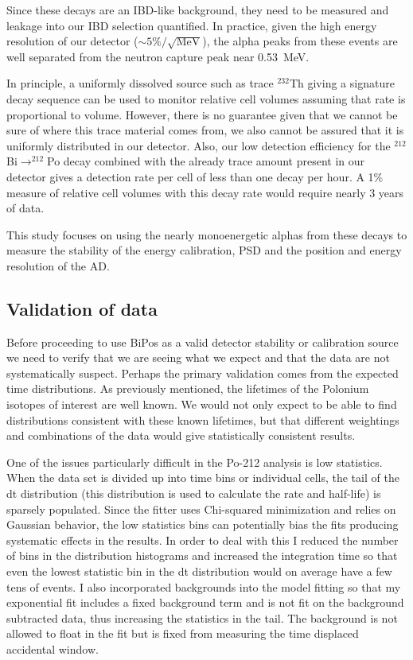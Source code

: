 \begin{itemize}
\end{itemize}

Since these decays are an IBD-like background, they need to be measured and leakage into our IBD selection quantified. In practice, given the high energy resolution of our detector ($\sim5\%/\sqrt{\textrm{MeV}}$), the alpha peaks from these events are well separated from the neutron capture peak near 0.53~MeV.

In principle, a uniformly dissolved source such as trace $^{232}$Th giving a signature decay sequence can be used to monitor relative cell volumes assuming that rate is proportional to volume. However, there is no guarantee given that we cannot be sure of where this trace material comes from, we also cannot be assured that it is uniformly distributed in our detector. Also, our low detection efficiency for the $^{212}$Bi$\rightarrow^{212}$Po decay combined with the already trace amount present in our detector gives a detection rate per cell of less than one decay per hour. A 1\% measure of relative cell volumes with this decay rate would require nearly 3 years of data.

This study focuses on using the nearly monoenergetic alphas from these decays to measure the stability of the energy calibration, PSD and the position and energy resolution of the AD. 
\subsection{Validation of data}
Before proceeding to use BiPos as a valid detector stability or calibration source we need to verify that we are seeing what we expect and that the data are not systematically suspect. Perhaps the primary validation comes from the expected time distributions. As previously mentioned, the lifetimes of the Polonium isotopes of interest are well known. We would not only expect to be able to find distributions consistent with these known lifetimes, but that different weightings and combinations of the data would give statistically consistent results. 

One of the issues particularly difficult in the Po-212 analysis is low statistics. When the data set is divided up into time bins or individual cells, the tail of the dt distribution (this distribution is used to calculate the rate and half-life) is sparsely populated. Since the fitter uses Chi-squared minimization and relies on Gaussian behavior, the low statistics bins can potentially bias the fits producing systematic effects in the results. In order to deal with this I reduced the number of bins in the distribution histograms and increased the integration time so that even the lowest statistic bin in the dt distribution would on average have a few tens of events. I also incorporated backgrounds into the model fitting so that my exponential fit includes a fixed background term and is not fit on the background subtracted data, thus increasing the statistics in the tail. The background is not allowed to float in the fit but is fixed from measuring the time displaced accidental window. 

